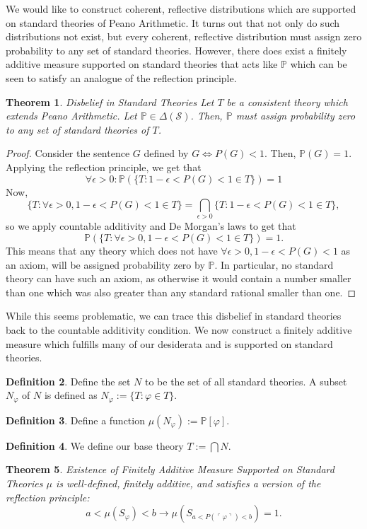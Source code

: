 \documentclass[12pt]{article}
\newcommand{\PP}{\mathbb{P}}
\newcommand{\vp}{\varphi}
\theoremstyle{plain}
\newtheorem{theorem}{Theorem}[subsection]
\theoremstyle{definition}
\newtheorem{definition}[theorem]{Definition}
\theoremstyle{remark}
\begin{document}
We would like to construct coherent, reflective distributions which are supported on standard theories of Peano Arithmetic. It turns out that not only do such distributions not exist, but every coherent, reflective distribution must assign zero probability to any set of standard theories. However, there does exist a finitely additive measure supported on standard theories that acts like $\PP$ which can be seen to satisfy an analogue of the reflection principle.
\begin{theorem} \emph{Disbelief in Standard Theories}
Let $T$ be a consistent theory which extends Peano Arithmetic.
Let $\PP\in\Delta(\mathcal{S})$.
Then, $\PP$ must assign probability zero to any set of standard theories of $T$.
\end{theorem}
\begin{proof}
Consider the sentence $G$ defined by $G \iff P(G) < 1$.
Then, $\PP(G)=1$.
Applying the reflection principle, we get that 
$$\forall\epsilon>0: \PP(\{T:1-\epsilon<P(G)<1\in T\})=1$$
Now, 
$$\{T:\forall \epsilon>0,1-\epsilon<P(G)<1\in T\}=\bigcap_{\epsilon>0}\{T:1-\epsilon<P(G)<1\in T\},$$ so we apply countable additivity and De Morgan's laws to get that $$\PP(\{T:\forall \epsilon>0,1-\epsilon<P(G)<1\in T\})=1.$$
This means that any theory which does not have $\forall \epsilon>0,1-\epsilon<P(G)<1$ as an axiom, will be assigned probability zero by $\PP$.
In particular, no standard theory can have such an axiom, as otherwise it would contain a number smaller than one which was also greater than any standard rational smaller than one.
\end{proof}
While this seems problematic, we can trace this disbelief in standard theories back to the countable additivity condition. We now construct a finitely additive measure which fulfills many of our desiderata and is supported on standard theories.
\begin{definition}
Define the set $N$ to be the set of all standard theories. A subset $N_{\vp}$ of $N$ is defined as $N_{\vp}:=\{T:\vp\in T\}$.
\end{definition}
\begin{definition}
Define a function $\mu(N_{\vp}):=\PP[\vp]$.
\end{definition}
\begin{definition}
We define our base theory $T:=\bigcap N$.
\end{definition}
\begin{theorem} \emph{Existence of Finitely Additive Measure Supported on Standard Theories}
$\mu$ is well-defined, finitely additive, and satisfies a version of the reflection principle:
$$a < \mu(S_{\vp}) < b \rightarrow \mu(S_{a < P(\ulcorner \vp \urcorner) < b}) = 1.$$
\end{theorem}
\end{document}
